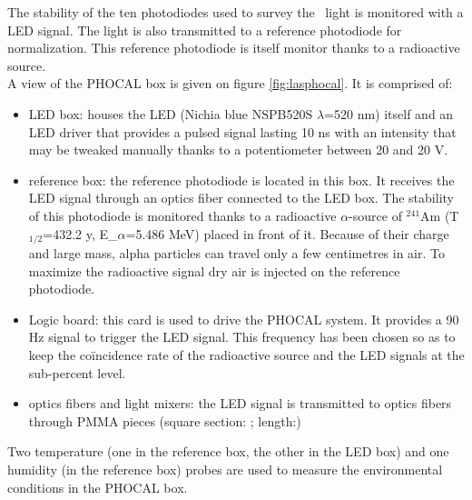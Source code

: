 The stability of the ten photodiodes used to survey the \laser~light is monitored with a LED signal. The light is also transmitted to a reference photodiode for normalization. This reference photodiode is itself monitor thanks to a radioactive source.\\
A view of the PHOCAL box is given on figure \ref{fig:lasphocal}. It is comprised of:
\begin{itemize}
\item LED box: houses the LED (Nichia blue NSPB520S $\lambda$=520 nm) itself and an LED driver that provides a pulsed signal lasting 10 ns with an intensity that may be tweaked manually thanks to a potentiometer between 20 and 20 V.
\item reference box: the reference photodiode is located in this box. It receives the LED signal through an optics fiber connected to the LED box. The stability of this photodiode is monitored thanks to a radioactive $\alpha$-source of $^{241}$Am (T$_{1/2}$=432.2 y, E_${\alpha}$=5.486 MeV) placed in front of it. Because of their charge and large mass, alpha particles can travel only a few centimetres in air. To maximize the radioactive signal dry air is injected on the reference photodiode.
\item Logic board: this card is used to drive the PHOCAL system. It provides a 90 Hz signal to trigger the LED signal. This frequency has been chosen so as to keep the coïncidence rate of the radioactive source and the LED signals at the sub-percent level.
\item optics fibers and light mixers: the LED signal is transmitted to optics fibers through PMMA pieces (square section: ; length:) 
\end{itemize}
Two temperature (one in the reference box, the other in the LED box) and one humidity (in the reference box) probes are used to measure the environmental conditions in the PHOCAL box. 

